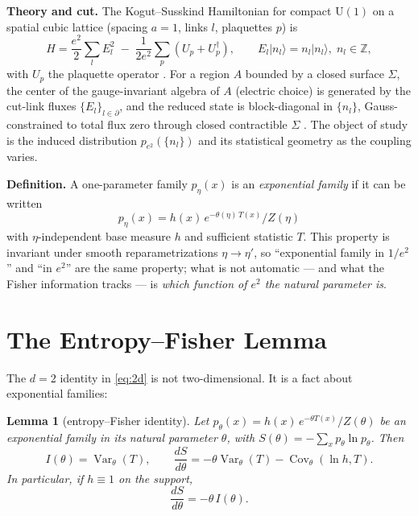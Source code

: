 \documentclass[11pt]{article}
\newtheorem{lemma}[theorem]{Lemma}
\theoremstyle{remark}
\theoremstyle{plain}
\newcommand{\Var}{\operatorname{Var}}
\newcommand{\Cov}{\operatorname{Cov}}
\newcommand{\Z}{\mathbb{Z}}
\begin{document}
\textbf{Theory and cut.} The Kogut--Susskind Hamiltonian for compact $\mathrm{U}(1)$ on a spatial cubic lattice (spacing $a = 1$, links $l$, plaquettes $p$) is
\begin{equation}\label{eq:KS}
H = \frac{e^2}{2} \sum_l E_l^2 \;-\; \frac{1}{2e^2} \sum_p \left( U_p + U_p^\dagger \right), \qquad E_l |n_l\rangle = n_l |n_l\rangle, \; n_l \in \Z,
\end{equation}
with $U_p$ the plaquette operator \cite{KS75}. For a region $A$ bounded by a closed surface $\Sigma$, the center of the gauge-invariant algebra of $A$ (electric choice) is generated by the cut-link fluxes $\{E_l\}_{l \in \partial}$, and the reduced state is block-diagonal in $\{n_l\}$, Gauss-constrained to total flux zero through closed contractible $\Sigma$ \cite{D11, CHR, GST15, DW16}. The object of study is the induced distribution $p_{e^2}(\{n_l\})$ and its statistical geometry as the coupling varies.

\textbf{Definition.} A one-parameter family $p_\eta(x)$ is an \emph{exponential family} if it can be written
\[
p_\eta(x) = h(x)\, e^{-\theta(\eta)\, T(x)} / Z(\eta)
\]
with $\eta$-independent base measure $h$ and sufficient statistic $T$. This property is invariant under smooth reparametrizations $\eta \to \eta'$, so ``exponential family in $1/e^2$'' and ``in $e^2$'' are the same property; what is not automatic --- and what the Fisher information tracks --- is \emph{which function of $e^2$ the natural parameter is}.

\section{The Entropy--Fisher Lemma}\label{sec:lemma}

The $d=2$ identity in \eqref{eq:2d} is not two-dimensional. It is a fact about exponential families:

\begin{lemma}[entropy--Fisher identity]\label{lem:fisher}
Let $p_\theta(x) = h(x)\, e^{-\theta T(x)}/Z(\theta)$ be an exponential family in its natural parameter $\theta$, with $S(\theta) = -\sum_x p_\theta \ln p_\theta$. Then
\[
I(\theta) = \Var_\theta(T), \qquad \frac{dS}{d\theta} = -\theta \Var_\theta(T) - \Cov_\theta(\ln h, T).
\]
In particular, if $h \equiv 1$ on the support,
\begin{equation}\label{eq:identity}
\frac{dS}{d\theta} = -\theta\, I(\theta).
\end{equation}
\end{lemma}
\end{document}
